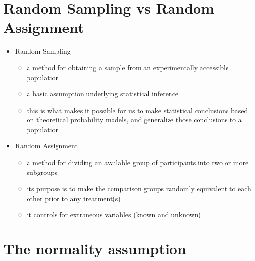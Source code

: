 \documentclass[12pt]{article}
\begin{document}
\section{Random Sampling vs Random
Assignment}\label{random-sampling-vs-random-assignment}

\begin{itemize}
\itemsep1pt\parskip0pt
\item
  Random Sampling

  \begin{itemize}
  \itemsep1pt\parskip0pt
  \item
    a method for obtaining a sample from an experimentally accessible
    population
  \item
    a basic assumption underlying statistical inference
  \item
    this is what makes it possible for us to make statistical
    conclusions based on theoretical probability models, and generalize
    those conclusions to a population
  \end{itemize}
\item
  Random Assignment

  \begin{itemize}
  \itemsep1pt\parskip0pt
  \item
    a method for dividing an available group of participants into two or
    more subgroups
  \item
    its purpose is to make the comparison groups randomly equivalent to
    each other prior to any treatment(s)
  \item
    it controls for extraneous variables (known and unknown)
  \end{itemize}
\end{itemize}

\section{The normality assumption}\label{the-normality-assumption}
\end{document}
